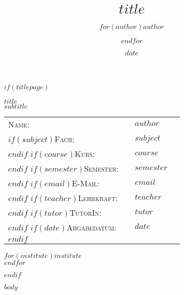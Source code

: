\documentclass[$if(font-size)$$font-size$$else$12pt$endif$, $if(paper-format)$$paper-format$$else$a4paper$endif$]{article}
\title{$title$}
\author{$for(author)$$author$\and$endfor$}
\date{$date$}
\begin{document}
\onehalfspacing %

$if(titlepage)$
\pagestyle{plain}
\vspace*{2cm}

\begin{center}
  {\huge $title$}\\[1cm]
  {\LARGE $subtitle$}\\[5cm]
\end{center}

\vspace*{2cm}

\begin{tabular}{p{3.5cm}|p{0.1cm} p{10cm}l}
  \textsc{Name:}                   &  & \textsc{$author$}   \\
  $if(subject)$\textsc{Fach:}      &  & \textsc{$subject$}  \\ $endif$
  $if(course)$\textsc{Kurs:}       &  & \textsc{$course$}   \\ $endif$
  $if(semester)$\textsc{Semester:} &  & \textsc{$semester$} \\ $endif$
  $if(email)$\textsc{E-Mail:}      &  & \textsc{$email$}    \\ $endif$
  $if(teacher)$\textsc{Lehrkraft:} &  & \textsc{$teacher$}  \\ $endif$
  $if(tutor)$\textsc{TutorIn:}     &  & \textsc{$tutor$}    \\ $endif$
  $if(date)$\textsc{Abgabedatum:}  &  & \textsc{$date$}     \\ $endif$
\end{tabular}

\vspace*{4cm}

\begin{center}
  $for(institute)$$institute$ \\$endfor$
\end{center}
\clearpage
\pagestyle{$if(pagestyle)$$pagestyle$$else$homework$endif$}
$endif$

$body$
\end{document}
